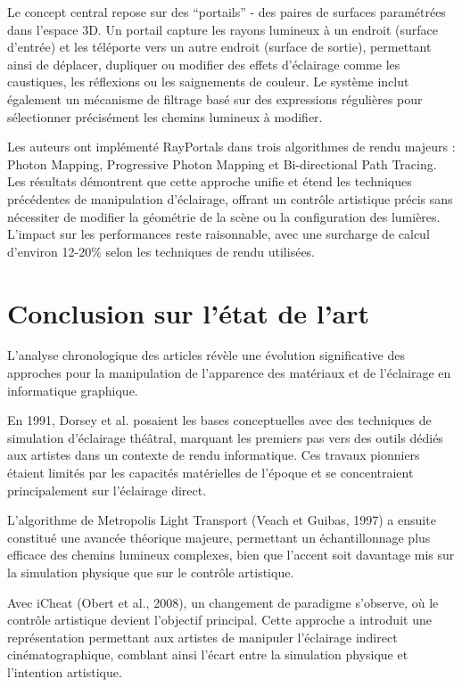 \documentclass[runningheads]{llncs}
\begin{document}
Le concept central repose sur des ``portails'' - des paires de surfaces paramétrées dans l'espace 3D. Un portail capture les rayons lumineux à un endroit (surface d'entrée) et les téléporte vers un autre endroit (surface de sortie), permettant ainsi de déplacer, dupliquer ou modifier des effets d'éclairage comme les caustiques, les réflexions ou les saignements de couleur. Le système inclut également un mécanisme de filtrage basé sur des expressions régulières pour sélectionner précisément les chemins lumineux à modifier.

Les auteurs ont implémenté RayPortals dans trois algorithmes de rendu majeurs : Photon Mapping, Progressive Photon Mapping et Bi-directional Path Tracing. Les résultats démontrent que cette approche unifie et étend les techniques précédentes de manipulation d'éclairage, offrant un contrôle artistique précis sans nécessiter de modifier la géométrie de la scène ou la configuration des lumières. L'impact sur les performances reste raisonnable, avec une surcharge de calcul d'environ 12-20\% selon les techniques de rendu utilisées.

\newpage
\section{Conclusion sur l'état de l'art}

L'analyse chronologique des articles révèle une évolution significative des approches pour la manipulation de l'apparence des matériaux et de l'éclairage en informatique graphique.

En 1991, Dorsey et al. posaient les bases conceptuelles avec des techniques de simulation d'éclairage théâtral, marquant les premiers pas vers des outils dédiés aux artistes dans un contexte de rendu informatique. Ces travaux pionniers étaient limités par les capacités matérielles de l'époque et se concentraient principalement sur l'éclairage direct.

L'algorithme de Metropolis Light Transport (Veach et Guibas, 1997) a ensuite constitué une avancée théorique majeure, permettant un échantillonnage plus efficace des chemins lumineux complexes, bien que l'accent soit davantage mis sur la simulation physique que sur le contrôle artistique.

Avec iCheat (Obert et al., 2008), un changement de paradigme s'observe, où le contrôle artistique devient l'objectif principal. Cette approche a introduit une représentation permettant aux artistes de manipuler l'éclairage indirect cinématographique, comblant ainsi l'écart entre la simulation physique et l'intention artistique.
\end{document}
